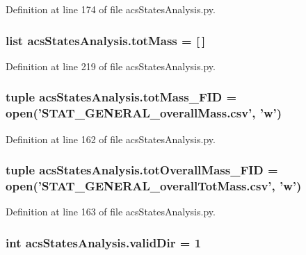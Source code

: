 Definition at line 174 of file acs\-States\-Analysis.\-py.

\hypertarget{a00104_ac2ecae6789d89cc56b0a731065837774}{
\subsubsection[{tot\-Mass}]{\setlength{\rightskip}{0pt plus 5cm}list acs\-States\-Analysis.\-tot\-Mass = \mbox{[}$\,$\mbox{]}}}\label{a00104_ac2ecae6789d89cc56b0a731065837774}


Definition at line 219 of file acs\-States\-Analysis.\-py.

\hypertarget{a00104_a1b7f5672822b59c7284cd2b703aacbc2}{
\subsubsection[{tot\-Mass\-\_\-\-F\-I\-D}]{\setlength{\rightskip}{0pt plus 5cm}tuple acs\-States\-Analysis.\-tot\-Mass\-\_\-\-F\-I\-D = open('S\-T\-A\-T\-\_\-\-G\-E\-N\-E\-R\-A\-L\-\_\-overall\-Mass.\-csv', 'w')}}\label{a00104_a1b7f5672822b59c7284cd2b703aacbc2}


Definition at line 162 of file acs\-States\-Analysis.\-py.

\hypertarget{a00104_a20a06acdb6e82bcaab87d2781d3555a9}{
\subsubsection[{tot\-Overall\-Mass\-\_\-\-F\-I\-D}]{\setlength{\rightskip}{0pt plus 5cm}tuple acs\-States\-Analysis.\-tot\-Overall\-Mass\-\_\-\-F\-I\-D = open('S\-T\-A\-T\-\_\-\-G\-E\-N\-E\-R\-A\-L\-\_\-overall\-Tot\-Mass.\-csv', 'w')}}\label{a00104_a20a06acdb6e82bcaab87d2781d3555a9}


Definition at line 163 of file acs\-States\-Analysis.\-py.

\hypertarget{a00104_aebb18ab2b73e7e2705ee42c728c0a72b}{
\subsubsection[{valid\-Dir}]{\setlength{\rightskip}{0pt plus 5cm}int acs\-States\-Analysis.\-valid\-Dir = 1}}\label{a00104_aebb18ab2b73e7e2705ee42c728c0a72b}


